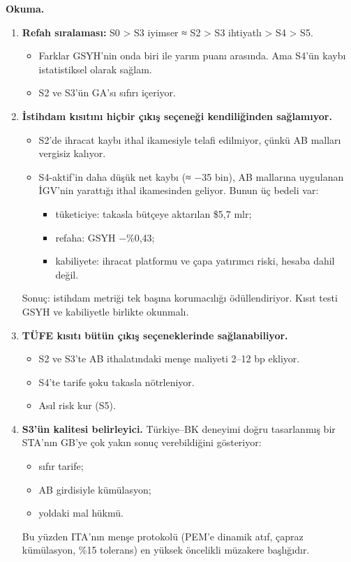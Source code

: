\textbf{Okuma.}

\begin{enumerate}
\def\labelenumi{\arabic{enumi}.}
\item
  \textbf{Refah sıralaması:} S0 \textgreater{} S3 iyimser ≈ S2 \textgreater{} S3 ihtiyatlı \textgreater{} S4 \textgreater{} S5.

  \begin{itemize}
  \tightlist
  \item
    Farklar GSYH'nin onda biri ile yarım puanı arasında. Ama S4'ün kaybı istatistiksel olarak sağlam.
  \item
    S2 ve S3'ün GA'sı sıfırı içeriyor.
  \end{itemize}
\item
  \textbf{İstihdam kısıtını hiçbir çıkış seçeneği kendiliğinden sağlamıyor.}

  \begin{itemize}
  \tightlist
  \item
    S2'de ihracat kaybı ithal ikamesiyle telafi edilmiyor, çünkü AB malları vergisiz kalıyor.
  \item
    S4-aktif'in daha düşük net kaybı (≈ −35 bin), AB mallarına uygulanan İGV'nin yarattığı ithal ikamesinden geliyor. Bunun üç bedeli var:

    \begin{itemize}
    \tightlist
    \item
      tüketiciye: takasla bütçeye aktarılan \$5,7 mlr;
    \item
      refaha: GSYH −\%0,43;
    \item
      kabiliyete: ihracat platformu ve çapa yatırımcı riski, hesaba dahil değil.
    \end{itemize}
  \end{itemize}

  Sonuç: istihdam metriği tek başına korumacılığı ödüllendiriyor. Kısıt testi GSYH ve kabiliyetle birlikte okunmalı.
\item
  \textbf{TÜFE kısıtı bütün çıkış seçeneklerinde sağlanabiliyor.}

  \begin{itemize}
  \tightlist
  \item
    S2 ve S3'te AB ithalatındaki menşe maliyeti 2--12 bp ekliyor.
  \item
    S4'te tarife şoku takasla nötrleniyor.
  \item
    Asıl risk kur (S5).
  \end{itemize}
\item
  \textbf{S3'ün kalitesi belirleyici.} Türkiye--BK deneyimi doğru tasarlanmış bir STA'nın GB'ye çok yakın sonuç verebildiğini gösteriyor:

  \begin{itemize}
  \tightlist
  \item
    sıfır tarife;
  \item
    AB girdisiyle kümülasyon;
  \item
    yoldaki mal hükmü.
  \end{itemize}

  Bu yüzden ITA'nın menşe protokolü (PEM'e dinamik atıf, çapraz kümülasyon, \%15 tolerans) en yüksek öncelikli müzakere başlığıdır.
\end{enumerate}

